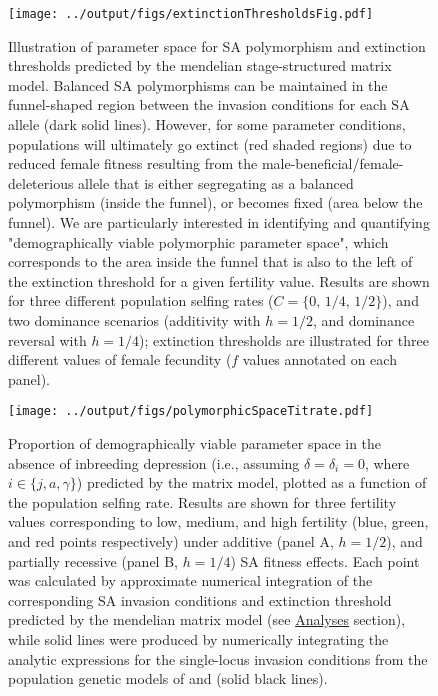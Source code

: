 \documentclass[11pt]{article}
\begin{document}
 \begin{figure}[htbp]
 \centering
 \texttt{[image: ../output/figs/extinctionThresholdsFig.pdf]}
 \caption{Illustration of parameter space for SA polymorphism and extinction thresholds predicted by the mendelian stage-structured matrix model. Balanced SA polymorphisms can be maintained in the funnel-shaped region between the invasion conditions for each SA allele (dark solid lines). However, for some parameter conditions, populations will ultimately go extinct (red shaded regions) due to reduced female fitness resulting from the male-beneficial/female-deleterious allele that is either segregating as a balanced polymorphism (inside the funnel), or becomes fixed (area below the funnel). We are particularly interested in identifying and quantifying "demographically viable polymorphic parameter space", which corresponds to the area inside the funnel that is also to the left of the extinction threshold for a given fertility value. Results are shown for three different population selfing rates ($C = \{0,\,1/4,\,1/2\}$), and two dominance scenarios (additivity with $h = 1/2$, and dominance reversal with $h = 1/4$); extinction thresholds are illustrated for three different values of female fecundity ($f$ values annotated on each panel). }
 \label{fig:extThresholds}
 \end{figure}



 \begin{figure}[htbp]
 \centering
 \texttt{[image: ../output/figs/polymorphicSpaceTitrate.pdf]}
 \caption{Proportion of demographically viable parameter space in the absence of inbreeding depression (i.e., assuming $\delta = \delta_i = 0$, where $i \in \{j,a,\gamma\}$) predicted by the matrix model, plotted as a function of the population selfing rate. Results are shown for three fertility values corresponding to low, medium, and high fertility (blue, green, and red points respectively) under additive (panel A, $h = 1/2$), and partially recessive (panel B, $h = 1/4$) SA fitness effects. Each point was calculated by approximate numerical integration of the corresponding SA invasion conditions and extinction threshold predicted by the mendelian matrix model (see \hyperref[sec:analyses]{Analyses} section), while solid lines were produced by numerically integrating the analytic expressions for the single-locus invasion conditions from the population genetic models of \citet{JordanConnallon2014} and \citet{Olito2017} (solid black lines). } 
 \label{fig:polySpace}
 \end{figure}
\end{document}
